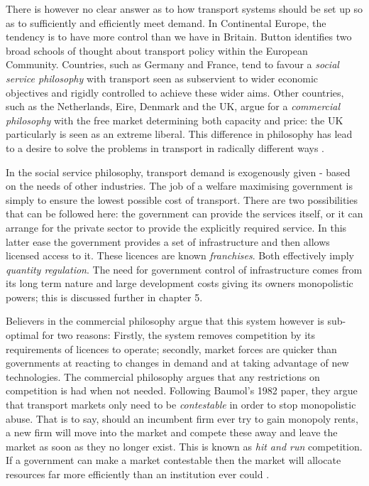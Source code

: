 There is however no clear answer as to how transport systems should be set up so as to sufficiently and efficiently meet demand. In Continental Europe, the tendency is to have more control than we have in Britain. Button identifies two broad schools of thought about transport policy within the European Community. Countries, such as Germany and France, tend to favour a \textit{social service philosophy} with transport seen as subservient to wider economic objectives and rigidly controlled to achieve these wider aims. Other countries, such as the Netherlands, Eire, Denmark and the UK, argue for a \textit{commercial philosophy} with the free market determining both capacity and price: the UK particularly is seen as an extreme liberal. This difference in philosophy has lead to a desire to solve the problems in transport in radically different ways \cite{Button:1993}.

In the social service philosophy, transport demand is exogenously given - based on the needs of other industries. The job of a welfare maximising government is simply to ensure the lowest possible cost of transport. There are two possibilities that can be followed here: the government can provide the services itself, or it can arrange for the private sector to provide the explicitly required service. In this latter ease the government provides a set of infrastructure and then allows licensed access to it. These licences are known \textit{franchises}. Both effectively imply \textit{quantity regulation}. The need for government control of infrastructure comes from its long term nature and large development costs giving its owners monopolistic powers; this is discussed further in chapter 5.

Believers in the commercial philosophy argue that this system however is sub-optimal for two reasons: Firstly, the system removes competition by its requirements of licences to operate; secondly, market forces are quicker than governments at reacting to changes in demand and at taking advantage of new technologies. The commercial philosophy argues that any restrictions on competition is had when not needed. Following Baumol's 1982 paper, they argue that transport markets only need to be \textit{contestable} in order to stop monopolistic abuse. That is to say, should an incumbent firm ever try to gain monopoly rents, a new firm will move into the market and compete these away and leave the market as soon as they no longer exist. This is known as \textit{hit and run} competition. If a government can make a market contestable then the market will allocate resources far more efficiently than an institution ever could \cite{Baumol:1982}.

